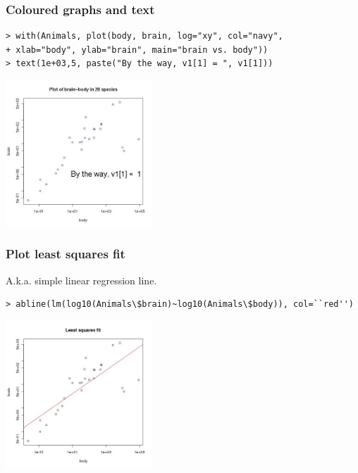 \documentclass{beamer}
\begin{document}

\begin{frame}[fragile]

 \frametitle{Coloured graphs and text}
 \begin{footnotesize}
\begin{verbatim}
> with(Animals, plot(body, brain, log="xy", col="navy",
+ xlab="body", ylab="brain", main="brain vs. body"))
> text(1e+03,5, paste("By the way, v1[1] = ", v1[1]))
 \end{verbatim}
\end{footnotesize}
 \vspace{-0.7cm}
 \begin{center}
\includegraphics[height=5.5cm]{figs/plot.jpg}  
 \end{center}

\end{frame}


\begin{frame}[fragile]

 \frametitle{Plot least squares fit}
A.k.a. simple linear regression line.
 \begin{footnotesize}
\begin{verbatim}
> abline(lm(log10(Animals\$brain)~log10(Animals\$body)), col=``red'')
 \end{verbatim}
\end{footnotesize}
 \vspace{-0.7cm}
 \begin{center}
\includegraphics[height=5.5cm]{figs/lm.jpeg}  
 \end{center}

\end{frame}
\end{document}
